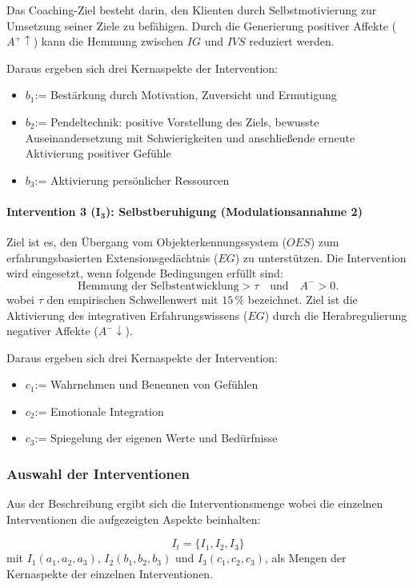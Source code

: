 Das Coaching-Ziel besteht darin, den Klienten durch
Selbstmotivierung zur Umsetzung seiner Ziele zu befähigen.
Durch die Generierung positiver Affekte ($A^+ \uparrow$)
kann die Hemmung zwischen $IG$ und $IVS$ reduziert werden.

Daraus ergeben sich drei Kernaspekte der Intervention:
\begin{itemize}
    \item $b_1$:= Bestärkung durch Motivation, Zuversicht
    und Ermutigung
    \item $b_2$:= Pendeltechnik: positive Vorstellung des
    Ziels, bewusste Auseinandersetzung mit Schwierigkeiten
    und anschließende erneute Aktivierung positiver Gefühle
    \item $b_3$:= Aktivierung persönlicher Ressourcen
\end{itemize}


\paragraph{Intervention 3 ($\boldsymbol{I_3}$): Selbstberuhigung
(Modulationsannahme 2)}

Ziel ist es, den Übergang vom Objekterkennungssystem
($OES$) zum erfahrungsbasierten Extensionsgedächtnis
($EG$) zu unterstützen. Die Intervention wird eingesetzt,
wenn folgende Bedingungen erfüllt sind:
\[
\text{Hemmung der Selbstentwicklung} > \tau
\quad \text{und} \quad A^- > 0.
\]
wobei $\tau$ den empirischen Schwellenwert mit $15\,\%$ bezeichnet.
Ziel ist die Aktivierung des integrativen Erfahrungswissens
($EG$) durch die Herabregulierung negativer Affekte
($A^- \downarrow$).

Daraus ergeben sich drei Kernaspekte der Intervention:
\begin{itemize}
    \item $c_1$:= Wahrnehmen und Benennen von Gefühlen
    \item $c_2$:= Emotionale Integration
    \item $c_3$:= Spiegelung der eigenen Werte und Bedürfnisse
\end{itemize}


\subsubsection{Auswahl der Interventionen}
Aus der Beschreibung ergibt sich die Interventionsmenge wobei die einzelnen Interventionen die aufgezeigten Aspekte beinhalten: 

\[ I_t = \{I_1, I_2, I_3\} \]
mit $I_1(a_1, a_2, a_3)$, $I_2(b_1, b_2, b_3)$ und $I_3(c_1, c_2, c_3)$, als Mengen der Kernaspekte der einzelnen Interventionen.

